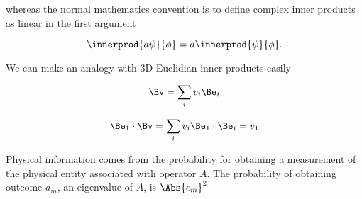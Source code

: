 whereas the normal mathematics convention is to define complex inner products as linear in the \underline{first} argument

\begin{equation}\label{eqn:PHY356FLecture10:51f}
\innerprod{a \psi}{\phi} = a \innerprod{\psi}{\phi}.
\end{equation}

We can make an analogy with 3D Euclidian inner products easily

\begin{equation}\label{eqn:lecture5BigReviewCh1Formalism:91}
\begin{aligned}
\Bv = \sum_i v_i \Be_i
\end{aligned}
\end{equation}

\begin{equation}\label{eqn:lecture5BigReviewCh1Formalism:111}
\begin{aligned}
\Be_1 \cdot \Bv = \sum_i v_i \Be_1 \cdot \Be_i = v_1
\end{aligned}
\end{equation}

Physical information comes from the probability for obtaining a measurement of the physical entity associated with operator $A$.  The probability of obtaining outcome $a_m$, an eigenvalue of $A$, is $\Abs{c_m}^2$

